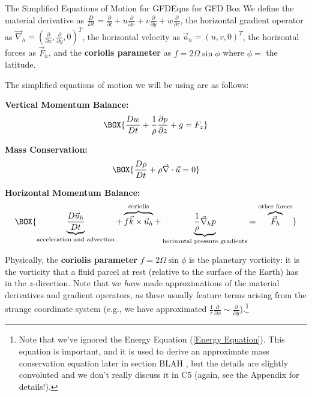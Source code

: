 \begin{fact}{The Simplified Equations of Motion for GFD}{Eqns for GFD Box}\label{Eqns for GFD Box}
    We define the material derivative as \(\frac{D}{Dt}=\frac{\partial}{\partial t}+u\frac{\partial}{\partial x}+v\frac{\partial}{\partial y}+w\frac{\partial}{\partial z}\), the horizontal gradient operator as \(\vec{\nabla}_h=\left( \frac{\partial}{\partial x},\frac{\partial}{\partial y},0 \right)^T\), the horizontal velocity as \(\vec{u}_h=\left( u,v,0 \right)^T\), the horizontal forces as \(\vec{F}_h\), and the \textbf{coriolis parameter} as \(f=2\Omega\sin\phi\) where \(\phi=\) the latitude.

    The simplified equations of motion we will be using are as follows: \vspace{2mm}

    \begin{minipage}{0.48\linewidth}
        \centering
        \textbf{Vertical Momentum Balance:}
        \begin{gather}
            \label{Vertical Approximate}
            \BOX{\frac{Dw}{Dt}+\frac{1}{\rho}\frac{\partial p }{\partial z}+g=F_z}
        \end{gather}
    \end{minipage}
    \hfill
    \begin{minipage}{0.48\linewidth}
        \centering
        \textbf{Mass Conservation:}
        \begin{gather}
            \label{Mass Conservation}
        \BOX{\frac{D\rho}{Dt}+\rho\vec{\nabla}\cdot\vec{u}=0}
        \end{gather}
    \end{minipage}

    \vspace{2mm}
    \centering
    \textbf{Horizontal Momentum Balance:}
    \begin{gather}
        \label{Horizontal Approximate}
        \BOX{\underbrace{\frac{D\vec{u}_h}{Dt}}_\text{acceleration and advection}+
        \overbrace{f\vec{k}\times\vec{u}_h}^\text{coriolis}+
        \underbrace{\frac{1}{\rho}\vec{\nabla}_hp}_\text{horizontal pressure gradients}=\overbrace{\vec{F}_h}^\text{other forces}}
    \end{gather}
\end{fact}

Physically, the \textbf{coriolis parameter} \(f=2\Omega \sin \phi\) is the planetary vorticity: it is the vorticity that a fluid parcel at rest (relative to the surface of the Earth) has in the \(z\)-direction. Note that we \textit{have} made approximations of the material derivatives and gradient operators, as these usually feature terms arising from the strange coordinate system (e.g., we have approximated \(\frac{1}{r}\frac{\partial}{\partial\phi}\sim\frac{\partial}{\partial y}\)).\footnote{Note that we've ignored the Energy Equation (\ref{Energy Equation}). This equation is important, and it is used to derive an approximate mass conservation equation later in section BLAH , but the details are slightly convoluted and we don't really discuss it in C5 (again, see the Appendix for details!).}

